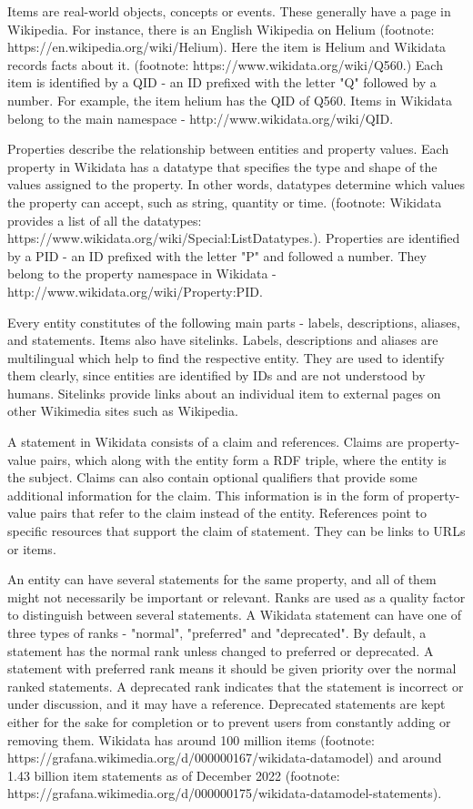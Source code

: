 Items are real-world objects, concepts or events.  These generally have a page in Wikipedia. For instance, there is an English Wikipedia on Helium (footnote: https://en.wikipedia.org/wiki/Helium). Here the item is Helium and Wikidata records facts about it. (footnote: https://www.wikidata.org/wiki/Q560.) Each item is identified by a QID - an ID prefixed with the letter "Q" followed by a number. For example, the item helium has the QID of Q560. Items in Wikidata belong to the main namespace - http://www.wikidata.org/wiki/QID. 

Properties describe the relationship between entities and property values. Each property in Wikidata has a datatype that specifies the type and shape of the values assigned to the property. In other words, datatypes determine which values the property can accept, such as string, quantity or time. (footnote: Wikidata provides a list of all the datatypes: https://www.wikidata.org/wiki/Special:ListDatatypes.). Properties are identified by a PID - an ID prefixed with the letter "P" and followed a number. They belong to the property namespace in Wikidata - http://www.wikidata.org/wiki/Property:PID. 

Every entity constitutes of the following main parts - labels, descriptions, aliases, and statements. Items also have sitelinks. Labels, descriptions and aliases are multilingual which help to find the respective entity. They are used to identify them clearly, since entities are identified by IDs and are not understood by humans. Sitelinks provide links about an individual item to external pages on other Wikimedia sites such as Wikipedia. 

A statement in Wikidata consists of a claim and references. Claims are property-value pairs, which along with the entity form a RDF triple, where the entity is the subject. Claims can also contain optional qualifiers that provide some additional information for the claim. This information is in the form of property-value pairs that refer to the claim instead of the entity. References point to specific resources that support the claim of statement. They can be links to URLs or items.

An entity can have several statements for the same property, and all of them might not necessarily be important or relevant. Ranks are used as a quality factor to distinguish between several statements. A Wikidata statement can have one of three types of ranks - "normal", "preferred" and "deprecated". By default, a statement has the normal rank unless changed to preferred or deprecated. A statement with preferred rank means it should be given priority over the normal ranked statements. A deprecated rank indicates that the statement is incorrect or under discussion, and it may have a reference. Deprecated statements are kept either for the sake for completion or to prevent users from constantly adding or removing them. Wikidata has around 100 million items (footnote: https://grafana.wikimedia.org/d/000000167/wikidata-datamodel) and around 1.43 billion item statements as of December 2022 (footnote: https://grafana.wikimedia.org/d/000000175/wikidata-datamodel-statements). 


